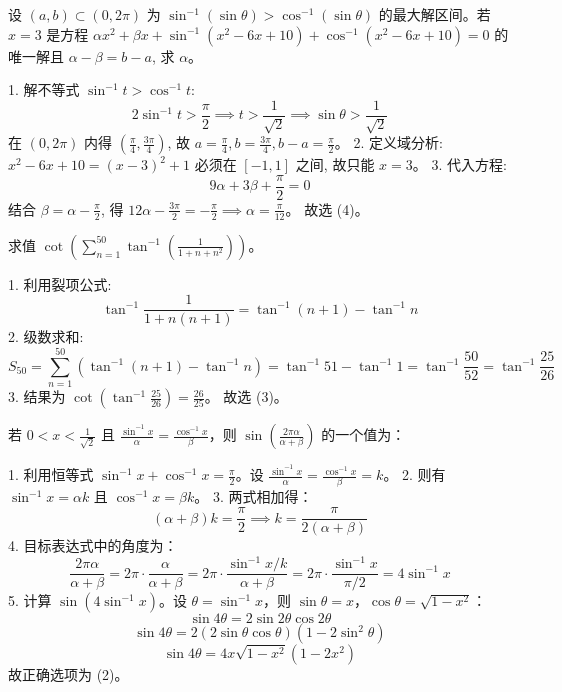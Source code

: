 \begin{questions}
\question
设 $(a, b) \subset (0, 2\pi)$ 为 $\sin^{-1}(\sin \theta) > \cos^{-1}(\sin \theta)$ 的最大解区间。若 $x=3$ 是方程 $\alpha x^2 + \beta x + \sin^{-1}(x^2 - 6x + 10) + \cos^{-1}(x^2 - 6x + 10) = 0$ 的唯一解且 $\alpha - \beta = b - a$, 求 $\alpha$。

\begin{solution}
1. 解不等式 $\sin^{-1} t > \cos^{-1} t$:
\[ 2\sin^{-1} t > \frac{\pi}{2} \implies t > \frac{1}{\sqrt{2}} \implies \sin \theta > \frac{1}{\sqrt{2}} \]
在 $(0, 2\pi)$ 内得 $(\frac{\pi}{4}, \frac{3\pi}{4})$, 故 $a = \frac{\pi}{4}, b = \frac{3\pi}{4}, b-a = \frac{\pi}{2}$。
2. 定义域分析: $x^2 - 6x + 10 = (x-3)^2 + 1$ 必须在 $[-1, 1]$ 之间, 故只能 $x=3$。
3. 代入方程:
\[ 9\alpha + 3\beta + \frac{\pi}{2} = 0 \]
结合 $\beta = \alpha - \frac{\pi}{2}$, 得 $12\alpha - \frac{3\pi}{2} = -\frac{\pi}{2} \implies \alpha = \frac{\pi}{12}$。
故选 (4)。
\end{solution}

\question
求值 $\cot \left( \sum_{n=1}^{50} \tan^{-1} \left( \frac{1}{1 + n + n^2} \right) \right)$。

\begin{solution}
1. 利用裂项公式:
\[ \tan^{-1} \frac{1}{1+n(n+1)} = \tan^{-1}(n+1) - \tan^{-1} n \]
2. 级数求和:
\[ S_{50} = \sum_{n=1}^{50} (\tan^{-1}(n+1) - \tan^{-1} n) = \tan^{-1} 51 - \tan^{-1} 1 = \tan^{-1} \frac{50}{52} = \tan^{-1} \frac{25}{26} \]
3. 结果为 $\cot(\tan^{-1} \frac{25}{26}) = \frac{26}{25}$。
故选 (3)。
\end{solution}

\question
若 $0 < x < \frac{1}{\sqrt{2}}$ 且 $\frac{\sin^{-1} x}{\alpha} = \frac{\cos^{-1} x}{\beta}$，则 $\sin\left(\frac{2\pi\alpha}{\alpha+\beta}\right)$ 的一个值为：

\begin{solution}
1. 利用恒等式 $\sin^{-1} x + \cos^{-1} x = \frac{\pi}{2}$。设 $\frac{\sin^{-1} x}{\alpha} = \frac{\cos^{-1} x}{\beta} = k$。
2. 则有 $\sin^{-1} x = \alpha k$ 且 $\cos^{-1} x = \beta k$。
3. 两式相加得：
\[
(\alpha + \beta)k = \frac{\pi}{2} \implies k = \frac{\pi}{2(\alpha + \beta)}
\]
4. 目标表达式中的角度为：
\[
\frac{2\pi\alpha}{\alpha+\beta} = 2\pi \cdot \frac{\alpha}{\alpha+\beta} = 2\pi \cdot \frac{\sin^{-1} x / k}{\alpha+\beta} = 2\pi \cdot \frac{\sin^{-1} x}{\pi / 2} = 4\sin^{-1} x
\]
5. 计算 $\sin(4\sin^{-1} x)$。设 $\theta = \sin^{-1} x$，则 $\sin \theta = x$，$\cos \theta = \sqrt{1-x^2}$：
\[
\sin 4\theta = 2\sin 2\theta \cos 2\theta
\]
\[
\sin 4\theta = 2(2\sin \theta \cos \theta)(1 - 2\sin^2 \theta)
\]
\[
\sin 4\theta = 4x\sqrt{1-x^2}(1-2x^2)
\]
故正确选项为 (2)。
\end{solution}


\end{questions}
